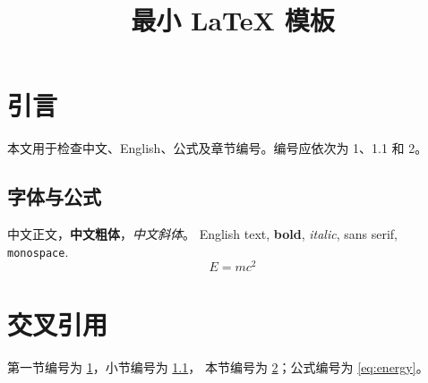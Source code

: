 \documentclass[UTF8,a4paper,11pt,fontset=fandol,scheme=plain]{ctexart}
\title{最小 LaTeX 模板}
\author{}
\date{}
\begin{document}
\maketitle

\section{引言}\label{sec:intro}
本文用于检查中文、English、公式及章节编号。编号应依次为 1、1.1 和 2。

\subsection{字体与公式}\label{sec:fonts}
中文正文，\textbf{中文粗体}，\textit{中文斜体}。
English text, \textbf{bold}, \textit{italic}, \textsf{sans serif}, \texttt{monospace}.
\begin{equation}\label{eq:energy}
  E = mc^2
\end{equation}

\section{交叉引用}\label{sec:refs}
第一节编号为 \ref{sec:intro}，小节编号为 \ref{sec:fonts}，
本节编号为 \ref{sec:refs}；公式编号为 \eqref{eq:energy}。
\end{document}

